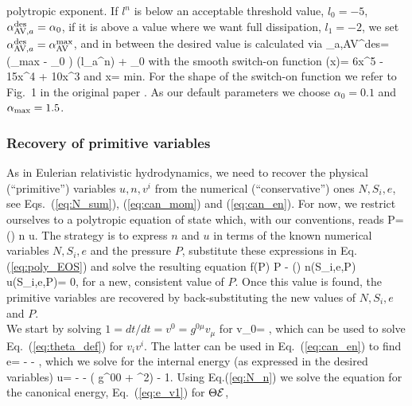 \documentclass[useAMS,usenatbib]{iopart}
\begin{document}
polytropic exponent.
If $l^n$ is below an acceptable threshold value, $l_0=-5$, $\alpha_{{\rm AV}, a}^{\rm des}= \alpha_0$, if it is
above a value where we want full dissipation, $l_1=-2$, we set $\alpha_{{\rm AV}, a}^{\rm des}= \alpha_{\rm AV}^{\rm max}$,
and in between the desired value is calculated via
\be
\alpha_{a,\rm AV}^{\rm des}= (\alpha_{\rm max} - \alpha_0 )\; (l_a^n) + \alpha_0
\ee
with the smooth switch-on function
\be
{}(x)= 6x^5 - 15x^4 + 10x^3
\ee
and
\be
x= \rm min.
\ee
For the shape of the switch-on function we refer to Fig.~1 in the original paper \cite{rosswog20b}.
As our default parameters we choose $\alpha_0= 0.1$  and $\alpha_{\rm max}= 1.5$.


\subsubsection{Recovery of primitive variables}
\label{sec:recovery}
As in Eulerian relativistic hydrodynamics, we need to recover the physical (``primitive'') variables $u, n, v^i$ from 
the numerical (``conservative'') ones  $N, S_i, e$, see Eqs.~(\ref{eq:N_sum}),   
(\ref{eq:can_mom}) and  (\ref{eq:can_en}). For now, we restrict ourselves to a polytropic equation
of state which, with our conventions, reads
\be
P= () n u.
\label{eq:poly_EOS}
\ee 
The strategy is to express $n$ and $u$ in terms of the known numerical variables $N, S_i, e$ and the pressure
$P$, substitute these expressions in Eq.(\ref{eq:poly_EOS}) and solve the resulting equation
\be
f(P) \equiv P - () \; n(S_i,e,P) \; u(S_i,e,P)= 0,
\label{eq:recovery_to_solve}
\ee
for a new, consistent value of $P$. Once this value is found, the primitive variables are  recovered by
back-substituting the new values of $N, S_i, e$ and $P$.\\
We start by solving $1= dt/dt= v^0= g^{0\mu}v_\mu$ for 
\be
v_0= ,
\label{eq:dum1}
\ee
which can be used to solve Eq.~(\ref{eq:theta_def}) for $v_i v^i$. The latter can be used in Eq.~(\ref{eq:can_en})
to find
\be
e=  -  - ,
\label{eq:e_v1}
\ee
which we solve for the internal energy (as expressed in the desired variables)
\be
u=  -  -  \left( g^{00} + \Theta^2\right) - 1.
\label{eq:u}
\ee
Using Eq.(\ref{eq:N_n}) we solve the equation for the canonical energy, Eq.~(\ref{eq:e_v1}) for $\Theta \mathcal{E}$,
\end{document}
